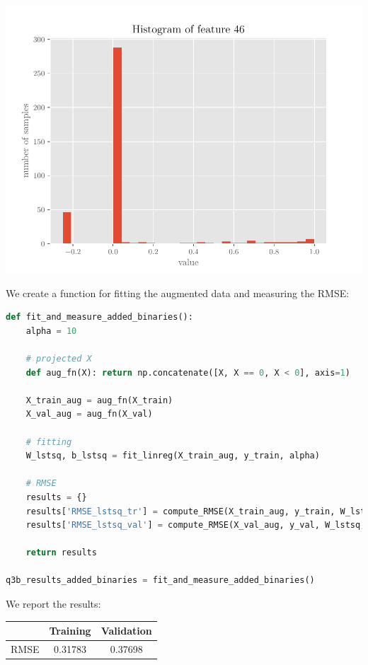 \documentclass{article}
\begin{document}
\includegraphics[scale=0.75]{fig_01.pdf}


We create a function for fitting the augmented data and measuring the RMSE:

\begin{lstlisting}[language=Python]
def fit_and_measure_added_binaries():
    alpha = 10

    # projected X
    def aug_fn(X): return np.concatenate([X, X == 0, X < 0], axis=1)

    X_train_aug = aug_fn(X_train)
    X_val_aug = aug_fn(X_val)

    # fitting
    W_lstsq, b_lstsq = fit_linreg(X_train_aug, y_train, alpha)
    
    # RMSE
    results = {}
    results['RMSE_lstsq_tr'] = compute_RMSE(X_train_aug, y_train, W_lstsq, b_lstsq)
    results['RMSE_lstsq_val'] = compute_RMSE(X_val_aug, y_val, W_lstsq, b_lstsq)
    
    return results

q3b_results_added_binaries = fit_and_measure_added_binaries()
\end{lstlisting}

We report the results:

\begin{center}
\begin{tabular}{ | c | c | c | }
\hline
 & Training & Validation \\
\hline
RMSE & 0.31783 & 0.37698 \\ 
\hline
\end{tabular}
\end{center}
\end{document}
